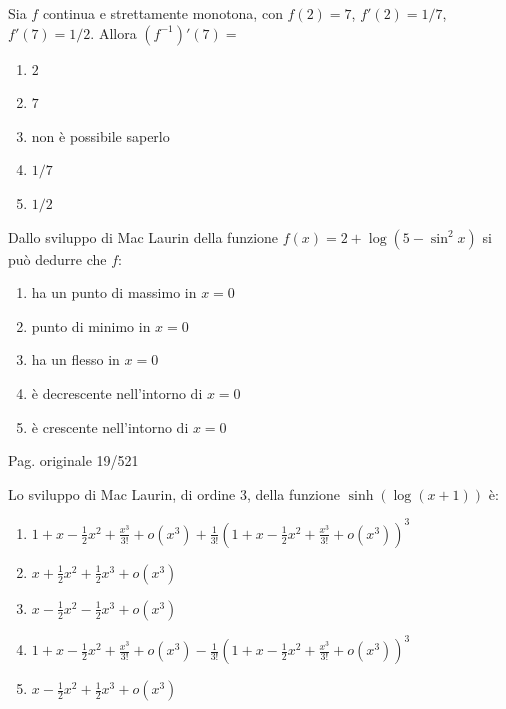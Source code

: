 \begin{quiz}
Sia $f$ continua e strettamente monotona, con $f(2)=7$, $f\prime(2)=1/7$, $f\prime(7)=1/2$. Allora $(f^{-1})\prime(7)=$
\begin{enumerate}[label=\alph*),leftmargin=1.3cm,itemsep=3pt,topsep=5pt]
\item $2$
\item $7$
\item non \`e possibile saperlo
\item $1/7$
\item $1/2$
\end{enumerate}
\end{quiz}

\begin{quiz}
Dallo sviluppo di Mac Laurin della funzione $f(x)=2+\log(5-\sin^2x)$ si pu\`o dedurre che $f$:
\begin{enumerate}[label=\alph*),leftmargin=1.3cm,itemsep=3pt,topsep=5pt]
\item ha un punto di massimo in $x=0$
\item punto di minimo in $x=0$
\item ha un flesso in $x=0$
\item \`e decrescente nell'intorno di $x=0$
\item \`e crescente nell'intorno di $x=0$
\end{enumerate}
\end{quiz}

\par\noindent\hfill{\color{cyan!65!black}\scriptsize Pag. originale 19/521}\par\smallskip

\begin{quiz}
Lo sviluppo di Mac Laurin, di ordine 3, della funzione $\sinh(\log(x+1))$ \`e:
\begin{enumerate}[label=\alph*),leftmargin=1.3cm,itemsep=3pt,topsep=5pt]
\item $1+x-\frac12x^2+\frac{x^3}{3!}+o(x^3)+\frac1{3!}(1+x-\frac12x^2+\frac{x^3}{3!}+o(x^3))^3$
\item $x+\frac12x^2+\frac12x^3+o(x^3)$
\item $x-\frac12x^2-\frac12x^3+o(x^3)$
\item $1+x-\frac12x^2+\frac{x^3}{3!}+o(x^3)-\frac1{3!}(1+x-\frac12x^2+\frac{x^3}{3!}+o(x^3))^3$
\item $x-\frac12x^2+\frac12x^3+o(x^3)$
\end{enumerate}
\end{quiz}

